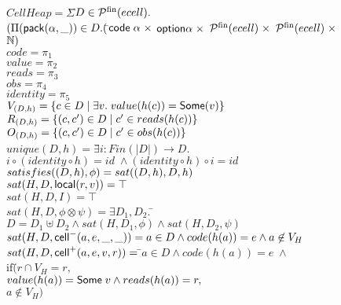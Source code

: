 \begin{figure}
\mbox{}
\begin{tabbing}
$CellHeap = \Sigma$\=$ D \in \mathcal{P}^{\mathrm{fin}}(ecell).$ \\
               \>$(\Pi (\mathsf{pack}({\alpha}, {\_})) \in D. ($\=${\mathsf{code}\;{\alpha}} \;\times$
                                         ${\mathsf{option }{\alpha}} \;\times$ 
                                         ${\mathcal{P}^{\mathrm{fin}}(ecell)} \;\times$ 
                                         ${\mathcal{P}^{\mathrm{fin}}(ecell)} \;\times$ 
                                         $\mathbb{N})$ \\[1em]
       

$code = \pi_1$ \\
$value = \pi_2$ \\
$reads = \pi_3$ \\
$obs = \pi_4$ \\
$identity = \pi_5$ \\[1em]

$V_{(D, h)} = \{{{c \in D}\;|\;{\exists v.\; value(h(c)) = \mathsf{Some}(v)}}\}$ \\
$R_{(D, h)} = \{{{(c,c') \in D}\;|\;{ c' \in reads(h(c)) }}\}$ \\
$O_{(D, h)} = \{{{(c,c') \in D}\;|\;{ c' \in obs(h(c)) }}\}$ \\[1em]

$unique(D,h) = \exists$\=$i : Fin(|D|) \to D.$\\
                       \>$i \circ (identity \circ h) = id \; \land (identity \circ h) \circ i = id$ \\[1em]

$satisfies({(D,h)}, {\phi}) = sat((D,h), D, h)$ \\[1em]

$sat(H, D, \mathsf{local}({r}, {v})) = \top$ \\
$sat(H, D, I) = \top$ \\
$sat(H, D, \phi \otimes \psi) = \exists D_1, D_2.\;$\=$D = D_1 \uplus D_2 
                                                      \land sat(H, D_1, \phi) 
                                                      \land sat(H, D_2, \psi)$ \\
$sat(H, D, \mathsf{cell}^{-}({a}, {e}, {\_}, {\_})) = a \in D \land code(h(a)) = e \land a \not \in V_H$ \\
$sat(H, D, \mathsf{cell}^{+}({a}, {e}, {v}, {r})) =\; $\=$ a \in D \land code(h(a)) = e \;\land$ \\
      \>$\mathrm{if}($\=$r \cap V_H = r,$ \\
      \>     \>$value(h(a)) = \mathsf{Some}\;v \land reads(h(a)) = r,$ \\
      \>     \>$a \not\in V_H)$\\[1em]
 


\end{tabbing}
\end{figure}
